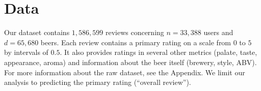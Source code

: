 \documentclass[12pt]{article}
\begin{document}




\section{Data}
Our dataset contains $1,586,599$ reviews concerning $n = 33,388$ users and $d = 65,680$ beers. Each review contains a primary rating on a scale from $0$ to $5$ by intervals of $0.5$. It also provides ratings in several other metrics (palate, taste, appearance, aroma) and information about the beer itself (brewery, style, ABV). For more information about the raw dataset, see the Appendix. We limit our analysis to predicting the primary rating (``overall review'').
\end{document}
